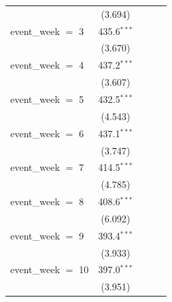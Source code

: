 \begin{tabular}{lcccc}
                                                           & (3.694)        &               &              &   \\   
   event\_week $=$ 3                                       & 435.6$^{***}$  &               &              &   \\   
                                                           & (3.670)        &               &              &   \\   
   event\_week $=$ 4                                       & 437.2$^{***}$  &               &              &   \\   
                                                           & (3.607)        &               &              &   \\   
   event\_week $=$ 5                                       & 432.5$^{***}$  &               &              &   \\   
                                                           & (4.543)        &               &              &   \\   
   event\_week $=$ 6                                       & 437.1$^{***}$  &               &              &   \\   
                                                           & (3.747)        &               &              &   \\   
   event\_week $=$ 7                                       & 414.5$^{***}$  &               &              &   \\   
                                                           & (4.785)        &               &              &   \\   
   event\_week $=$ 8                                       & 408.6$^{***}$  &               &              &   \\   
                                                           & (6.092)        &               &              &   \\   
   event\_week $=$ 9                                       & 393.4$^{***}$  &               &              &   \\   
                                                           & (3.933)        &               &              &   \\   
   event\_week $=$ 10                                      & 397.0$^{***}$  &               &              &   \\   
                                                           & (3.951)        &               &              &   \\   

\end{tabular}
